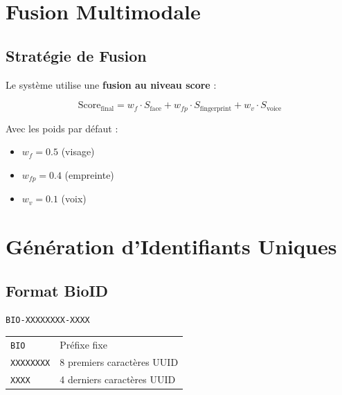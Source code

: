 \documentclass[12pt,a4paper]{report}
\begin{document}
\section{Fusion Multimodale}

\subsection{Stratégie de Fusion}

Le système utilise une \textbf{fusion au niveau score} :

\begin{equation}
    \text{Score}_{\text{final}} = w_f \cdot S_{\text{face}} + w_{fp} \cdot S_{\text{fingerprint}} + w_v \cdot S_{\text{voice}}
    \label{eq:fusion}
\end{equation}

\noindent Avec les poids par défaut :
\begin{itemize}
    \item $w_f = 0.5$ (visage)
    \item $w_{fp} = 0.4$ (empreinte)
    \item $w_v = 0.1$ (voix)
\end{itemize}

\section{Génération d'Identifiants Uniques}

\subsection{Format BioID}

\begin{tcolorbox}[colback=gray!10,colframe=gray!50,title=Format de l'identifiant BioID]
\centering
\texttt{BIO-XXXXXXXX-XXXX}\\[0.3cm]
\begin{tabular}{ll}
    \texttt{BIO} & Préfixe fixe \\
    \texttt{XXXXXXXX} & 8 premiers caractères UUID \\
    \texttt{XXXX} & 4 derniers caractères UUID \\
\end{tabular}
\end{tcolorbox}

\end{document}
